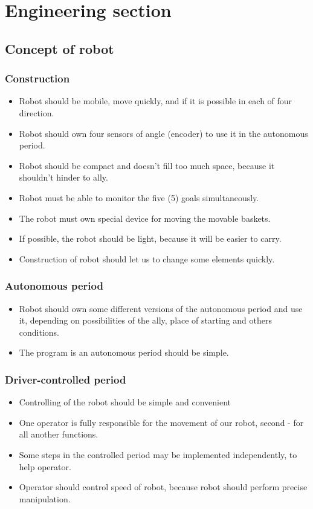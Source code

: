 \section{Engineering section}
\subsection{Concept of robot}
\subsubsection{Construction}
\begin{itemize}
	\item Robot should be mobile, move quickly, and if it is possible in each of four direction.
	\item Robot should own four sensors of angle (encoder) to use it in the autonomous period.
	\item Robot should be compact and doesn't fill too much space, because it shouldn't hinder to ally.
	\item Robot must be able to monitor the five (5) goals simultaneously. 
	\item The robot must own special device for moving the movable baskets.
	\item If possible, the robot should be light, because it will be easier to carry.
	\item Construction of robot should let us to change some elements quickly.
\end{itemize}
\subsubsection{Autonomous period}
\begin{itemize}
	\item Robot should own some different versions of the autonomous period and use it, depending on possibilities of the ally, place of starting and others conditions.
	\item The program is an autonomous period should be simple.
\end{itemize}
\subsubsection{Driver-controlled period}
\begin{itemize}
	\item Controlling of the robot should be simple and convenient
	\item One operator is fully responsible for the movement of our robot, second - for all another functions.
	\item Some steps in the controlled period may be  implemented independently, to help operator.
	\item Operator should control speed of robot, because robot should perform precise manipulation.
\end{itemize}
\fillpage

